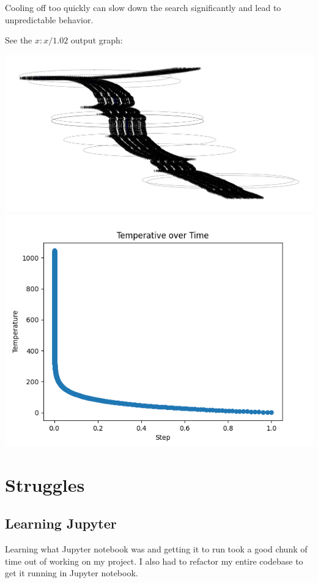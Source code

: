 \documentclass{article}
\begin{document}
Cooling off too quickly can slow down the search significantly 
and lead to unpredictable behavior.

See the $x : x / 1.02$ output graph:

\includegraphics[width=6in]{_static/Figure_5_Temp=1.02_Path=1031.png}
\includegraphics[width=6in]{_static/Figure_8_Temp=1.02_Temp-over-Time.png}

\section{Struggles}

\subsection{Learning Jupyter}

Learning what Jupyter notebook was and getting it to run took a good chunk of 
time out of working on my project. I also had to refactor my entire codebase 
to get it running in Jupyter notebook.
\end{document}
